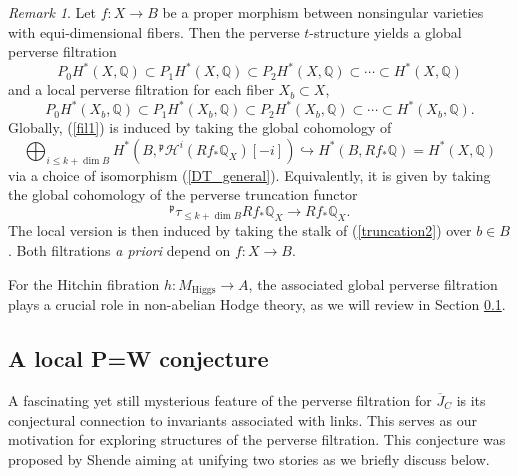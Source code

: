 \documentclass{pspum-l}
\theoremstyle{plain}
\theoremstyle{definition}
\theoremstyle{remark}
\newtheorem{rmk}[thm]{Remark}
\newcommand{\BQ}{{\mathbb{Q}}}
\newcommand{\CH}{{\mathcal H}}
\begin{document}
\begin{rmk}
    Let $f: X \to B$ be a proper morphism between nonsingular varieties with equi-dimensional fibers. Then the perverse $t$-structure yields a global perverse filtration
    \begin{equation}\label{fil1}
    P_0H^*(X, \BQ) \subset P_1H^*(X, \BQ) \subset P_2H^*(X, \BQ) \subset \cdots \subset H^*(X, \BQ)
    \end{equation}
    and a local perverse filtration for each fiber $X_b \subset X$,
    \begin{equation}\label{fil2}
     P_0H^*(X_b, \BQ) \subset P_1H^*(X_b, \BQ) \subset P_2H^*(X_b, \BQ) \subset \cdots \subset H^*(X_b, \BQ).
     \end{equation}
    Globally, (\ref{fil1}) is induced by taking the global cohomology of 
    \[
    \bigoplus_{i\leq k+ \dim B} H^*\left(B,{^\mathfrak{p}}\CH^i(Rf_* \BQ_X)[-i]\right) \hookrightarrow H^*(B, Rf_*\BQ) = H^*(X, \BQ)
    \]
    via a choice of isomorphism (\ref{DT_general}). Equivalently, it is given by taking the global cohomology of the perverse truncation functor
    \begin{equation}\label{truncation2}
    {^\mathfrak{p}}\tau_{\leq k+\dim B} Rf_* \BQ_{X} \to Rf_*\BQ_X.
    \end{equation}
    The local version is then induced by taking the stalk of (\ref{truncation2}) over $b \in B$. Both filtrations \emph{a priori} depend on $f: X \to B$.

    For the Hitchin fibration $h: M_{\mathrm{Higgs}} \to A$, the associated global perverse filtration plays a crucial role in non-abelian Hodge theory, as we will review in Section \ref{sec2.3}.
\end{rmk}














\subsection{A local P=W conjecture}\label{sec2.3}

A fascinating yet still mysterious feature of the perverse filtration for $\overline{J}_C$ is its conjectural connection to invariants associated with links. This serves as our motivation for exploring structures of the perverse filtration. This conjecture was proposed by Shende \cite{Sh0} aiming at unifying two stories as we briefly discuss below.
\end{document}
